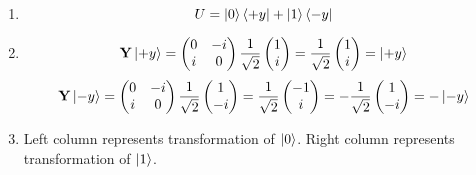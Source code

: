\documentclass[12pt]{article}
\begin{document}
\begin{enumerate}[font=\bfseries]
\begin{enumerate}
            \item \[U = \ket{0}\bra{+y} + \ket{1}\bra{-y}\]
            \item \[
                    \mathbf{Y}\ket{+y} = \begin{pmatrix}
                                        0 & -i \\
                                        i & 0
                                        \end{pmatrix}
                                        \frac{1}{\sqrt{2}}
                                        \begin{pmatrix}
                                        1 \\ i
                                        \end{pmatrix}
                                        =
                                        \frac{1}{\sqrt{2}}
                                        \begin{pmatrix}
                                        1 \\ i
                                        \end{pmatrix}
                                        =
                                        \ket{+y}
                    \]
                    \[
                    \mathbf{Y}\ket{-y} = \begin{pmatrix}
                                        0 & -i \\
                                        i & 0
                                        \end{pmatrix}
                                        \frac{1}{\sqrt{2}}
                                        \begin{pmatrix}
                                        1 \\ -i
                                        \end{pmatrix}
                                        =
                                        \frac{1}{\sqrt{2}}
                                        \begin{pmatrix}
                                        -1 \\ i
                                        \end{pmatrix}
                                        =
                                        -\frac{1}{\sqrt{2}}
                                        \begin{pmatrix}
                                        1 \\ -i
                                        \end{pmatrix}
                                        =
                                        -\ket{-y}
                    \]
            \item Left column represents transformation of $\ket{0}$. Right column represents transformation of $\ket{1}$.
        \end{enumerate}
\end{enumerate}
\end{document}

